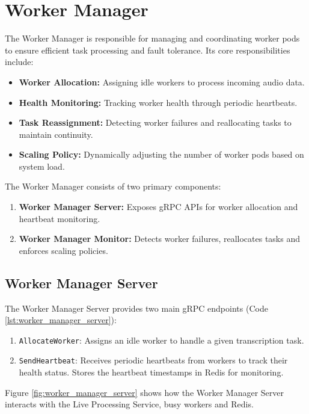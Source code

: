\section{Worker Manager} \label{section:worker_manager}
The Worker Manager is responsible for managing and coordinating worker pods to ensure efficient task processing and fault tolerance. Its core responsibilities include:
\begin{itemize}
  \item \textbf{Worker Allocation:} Assigning idle workers to process incoming audio data.
  \item \textbf{Health Monitoring:} Tracking worker health through periodic heartbeats.
  \item \textbf{Task Reassignment:} Detecting worker failures and reallocating tasks to maintain continuity.
  \item \textbf{Scaling Policy:} Dynamically adjusting the number of worker pods based on system load.
\end{itemize}


The Worker Manager consists of two primary components:
\begin{enumerate}
    \item \textbf{Worker Manager Server:} Exposes gRPC APIs for worker allocation and heartbeat monitoring.
    \item \textbf{Worker Manager Monitor:} Detects worker failures, reallocates tasks and enforces scaling policies.
\end{enumerate}

\subsection{Worker Manager Server}

The Worker Manager Server provides two main gRPC endpoints (Code \ref{lst:worker_manager_server}):
\begin{enumerate}
    \item \texttt{AllocateWorker}: Assigns an idle worker to handle a given transcription task.
    \item \texttt{SendHeartbeat}: Receives periodic heartbeats from workers to track their health status. Stores the heartbeat timestamps in Redis for monitoring.
\end{enumerate}

Figure \ref{fig:worker_manager_server} shows how the Worker Manager Server interacts with the Live Processing Service, busy workers and Redis.

